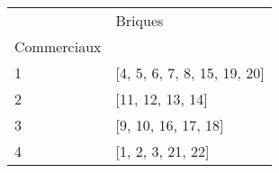 \documentclass[preview]{standalone}
\begin{document}
    \begin{tabular}{ll}
\toprule
 & Briques \\
Commerciaux &  \\
\midrule
1 & [4, 5, 6, 7, 8, 15, 19, 20] \\
2 & [11, 12, 13, 14] \\
3 & [9, 10, 16, 17, 18] \\
4 & [1, 2, 3, 21, 22] \\
\bottomrule
\end{tabular}

    
\end{document}

